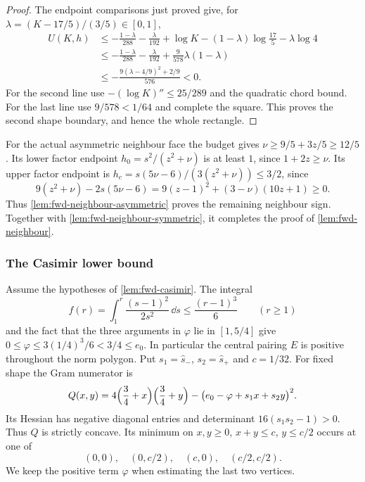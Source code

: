 \begin{proof}
The endpoint comparisons just proved give, for
$\lambda=(K-17/5)/(3/5)\in[0,1]$,
\begin{align*}
 U(K,h)
 &\le-\frac{1-\lambda}{288}-\frac{\lambda}{192}
  +\log K-(1-\lambda)\log\frac{17}{5}-\lambda\log4\\
 &\le-\frac{1-\lambda}{288}-\frac{\lambda}{192}
                         +\frac9{578}\lambda(1-\lambda)\\
 &\le-\frac{9(\lambda-4/9)^2+2/9}{576}<0.
\end{align*}
For the second line use $-(\log K)''\le25/289$ and the quadratic
chord bound. For the last line use $9/578<1/64$ and complete the square.
This proves the second shape boundary, and hence the whole rectangle.
\end{proof}

For the actual asymmetric neighbour face the budget gives
$\nu\ge9/5+3z/5\ge12/5$. Its lower factor endpoint
$h_0=s^2/(z^2+\nu)$ is at least $1$, since $1+2z\ge\nu$.
Its upper factor endpoint is
$h_c=s(5\nu-6)/(3(z^2+\nu))\le3/2$, since
\[
 9(z^2+\nu)-2s(5\nu-6)
 =9(z-1)^2+(3-\nu)(10z+1)\ge0.
\]
Thus \cref{lem:fwd-neighbour-asymmetric} proves the remaining neighbour
sign. Together with \cref{lem:fwd-neighbour-symmetric}, it completes
the proof of \cref{lem:fwd-neighbour}.

\subsubsection{The Casimir lower bound}\label{app:fwd-casimir}

Assume the hypotheses of \cref{lem:fwd-casimir}. The integral
\[
 f(r)=\int_1^r\frac{(s-1)^2}{2s^2}\,\dd s\le\frac{(r-1)^3}{6}
 \qquad(r\ge1)
\]
and the fact that the three arguments in $\varphi$ lie in $[1,5/4]$ give
$0\le\varphi\le3(1/4)^3/6<3/4\le e_0$.
In particular the central pairing $E$ is positive throughout the norm polygon.
Put $s_1=\hat s_-$, $s_2=\hat s_+$ and $c=1/32$. For fixed shape the Gram numerator is
\[
 Q(x,y)=4\Bigl(\frac34+x\Bigr)\Bigl(\frac34+y\Bigr)
       -\bigl(e_0-\varphi+s_1x+s_2y\bigr)^2.
\]
Its Hessian has negative diagonal entries and determinant $16(s_1s_2-1)>0$.
Thus $Q$ is strictly concave. Its minimum on
$x,y\ge0$, $x+y\le c$, $y\le c/2$ occurs at one of
\[
 (0,0),\quad (0,c/2),\quad(c,0),\quad(c/2,c/2).
\]
We keep the positive term $\varphi$ when estimating the last two vertices.

